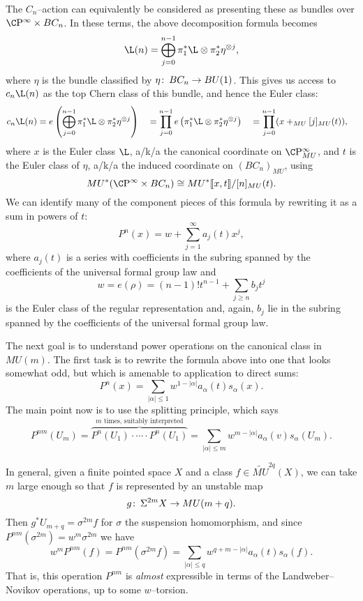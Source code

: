 The $C_n$--action can equivalently be considered as presenting these as bundles over $\CP^\infty \times BC_n$.  In these terms, the above decomposition formula becomes \[\L(n) = \bigoplus_{j=0}^{n-1} \pi_1^* \L \otimes \pi_2^* \eta^{\otimes j},\] where $\eta$ is the bundle classified by $\eta\colon\thinspace BC_n \to BU(1)$.  This gives us access to $c_n \L(n)$ as the top Chern class of this bundle, and hence the Euler class:
\begin{align*}
c_n \L(n) & = e\left( \bigoplus_{j=0}^{n-1} \pi_1^* \L \otimes \pi_2^* \eta^{\otimes j} \right) &
& = \prod_{j=0}^{n-1} e\left( \pi_1^* \L \otimes \pi_2^* \eta^{\otimes j} \right) &
& = \prod_{j=0}^{n-1} (x +_{MU} [j]_{MU}(t)),
\end{align*}
where $x$ is the Euler class $\L$, a/k/a the canonical coordinate on $\CP^\infty_{MU}$, and $t$ is the Euler class of $\eta$, a/k/a the induced coordinate on $(BC_n)_{MU}$, using \[MU^*(\CP^\infty \times BC_n) \cong MU^*\ps{x, t} / [n]_{MU}(t).\]  We can identify many of the component pieces of this formula by rewriting it as a sum in powers of $t$: \[P^n(x) = w + \sum_{j=1}^\infty a_j(t) x^j,\] where $a_j(t)$ is a series with coefficients in the subring spanned by the coefficients of the universal formal group law and \[w = e(\rho) = (n-1)! t^{n-1} + \sum_{j \ge n} b_j t^j\] is the Euler class of the regular representation and, again, $b_j$ lie in the subring spanned by the coefficients of the universal formal group law.



The next goal is to understand power operations on the canonical class in $MU(m)$.  The first task is to rewrite the formula above into one that looks somewhat odd, but which is amenable to application to direct sums: \[P^n(x) = \sum_{|\alpha| \le 1} w^{1 - |\alpha|} a_\alpha(t) s_\alpha(x).\]  The main point now is to use the splitting principle, which says \[P^{nm}(U_m) = \overset{\text{$m$ times, suitably interpreted}}{\overbrace{P^n(U_1) \cdot \cdots \cdot P^n(U_1)}} = \sum_{|\alpha| \le m} w^{m - |\alpha|} a_\alpha(v) s_\alpha(U_m).\]



In general, given a finite pointed space $X$ and a class $f \in \widetilde{MU}^{2q}(X)$, we can take $m$ large enough so that $f$ is represented by an unstable map \[g\colon\thinspace \Sigma^{2m} X \to MU(m+q).\]  Then $g^* U_{m+q} = \sigma^{2m} f$ for $\sigma$ the suspension homomorphism, and since $P^{nm}(\sigma^{2m}) = w^m \sigma^{2m}$ we have \[w^m P^{nm}(f) = P^{nm}(\sigma^{2m} f) = \sum_{|\alpha| \le q} w^{q+m - |\alpha|} a_\alpha(t) s_\alpha(f).\]  That is, this operation $P^{nm}$ is \emph{almost} expressible in terms of the Landweber--Novikov operations, up to some $w$--torsion.

